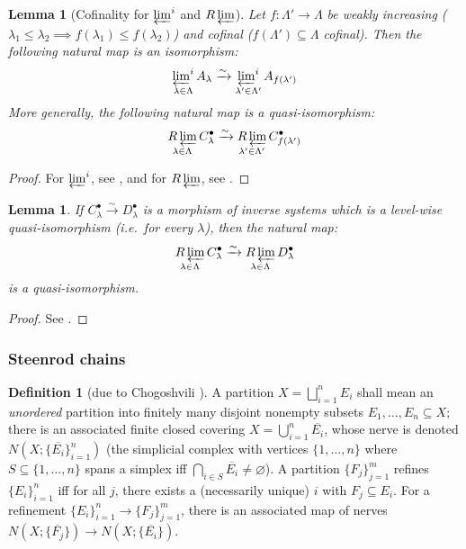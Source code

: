 \documentclass[12pt]{article}
\newtheorem{lemma}[theorem]{Lemma}
\theoremstyle{definition}
\newtheorem{definition}[theorem]{Definition}
\theoremstyle{remark}
\numberwithin{equation}{subsection}
\newcommand{\Rlim}{\mathop{R\varprojlim}}
\begin{document}
\begin{lemma}[Cofinality for $\varprojlim^i$ and $\Rlim$]\label{cofinalityforRlim}
Let $f:\Lambda'\to\Lambda$ be weakly increasing ($\lambda_1\leq\lambda_2\implies f(\lambda_1)\leq f(\lambda_2)$) and cofinal ($f(\Lambda')\subseteq\Lambda$ cofinal).  Then the following natural map is an isomorphism:
\begin{equation}
\mathop{\textstyle\varprojlim^i}\limits_{\lambda\in\Lambda}A_\lambda\xrightarrow\sim\mathop{\textstyle\varprojlim^i}\limits_{\lambda'\in\Lambda'}A_{f(\lambda')}
\end{equation}
More generally, the following natural map is a quasi-isomorphism:
\begin{equation}
\Rlim_{\lambda\in\Lambda}C^\bullet_\lambda\xrightarrow\sim\Rlim_{\lambda'\in\Lambda'}C^\bullet_{f(\lambda')}
\end{equation}
\end{lemma}

\begin{proof}
For $\textstyle\varprojlim^i$, see \cite[p291, Theorem 14.9]{mardesic}, and for $\Rlim$, see \cite[p349, Corollary 17.18]{mardesic}.
\end{proof}

\begin{lemma}\label{quasiisomorphismforRlim}
If $C_\lambda^\bullet\xrightarrow\sim D_\lambda^\bullet$ is a morphism of inverse systems which is a level-wise quasi-isomorphism (i.e.\ for every $\lambda$), then the natural map:
\begin{equation}
\Rlim_{\lambda\in\Lambda}C^\bullet_\lambda\xrightarrow\sim\Rlim_{\lambda\in\Lambda}D^\bullet_\lambda
\end{equation}
is a quasi-isomorphism.
\end{lemma}

\begin{proof}
See \cite[p348, Theorem 17.16]{mardesic}.
\end{proof}

\subsubsection{Steenrod chains}

\begin{definition}[due to Chogoshvili \cite{chogoshvili}]
A partition $X=\bigsqcup_{i=1}^nE_i$ shall mean an \emph{unordered} partition into finitely many disjoint nonempty subsets $E_1,\ldots,E_n\subseteq X$; there is an associated finite closed covering $X=\bigcup_{i=1}^n\overline{E_i}$, whose nerve is denoted $N(X;\{\overline{E_i}\}_{i=1}^n)$ (the simplicial complex with vertices $\{1,\ldots,n\}$ where $S\subseteq\{1,\ldots,n\}$ spans a simplex iff $\bigcap_{i\in S}\overline{E_i}\ne\varnothing$).  A partition $\{F_j\}_{j=1}^m$ refines $\{E_i\}_{i=1}^n$ iff for all $j$, there exists a (necessarily unique) $i$ with $F_j\subseteq E_i$.  For a refinement $\{E_i\}_{i=1}^n\to\{F_j\}_{j=1}^m$, there is an associated map of nerves $N(X;\{\overline{F_j}\})\to N(X;\{\overline{E_i}\})$.
\end{definition}
\end{document}
